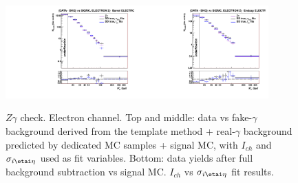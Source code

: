 \begin{figure}[htb]
\begin{center}
\includegraphics[width=0.45\textwidth]{../figs/figs_v11/ELECTRON_ZGamma/PrepareYields/c_BkgSubtrDATAvsSIGMC_c_ELECTRON_ZGamma__UNblind__Barrel__phoEt.pdf}\includegraphics[width=0.45\textwidth]{../figs/figs_v11/ELECTRON_ZGamma/PrepareYields/c_BkgSubtrDATAvsSIGMC_c_ELECTRON_ZGamma__UNblind__Endcap__phoEt.pdf}\\
  \caption{$Z\gamma$ check. Electron channel. Top and middle: data vs fake-$\gamma$ background derived from the template method + real-$\gamma$ background predicted by dedicated MC samples + signal MC, with $I_{ch}$ and $\sigma_{i\etai\eta}$ used as fit variables. Bottom: data yields after full background subtraction vs signal MC. $I_{ch}$ vs $\sigma_{i\etai\eta}$ fit results. }
  \label{fig:DDvsMC_Zg_Data_ELECTRON}
  \end{center}
\end{figure}

